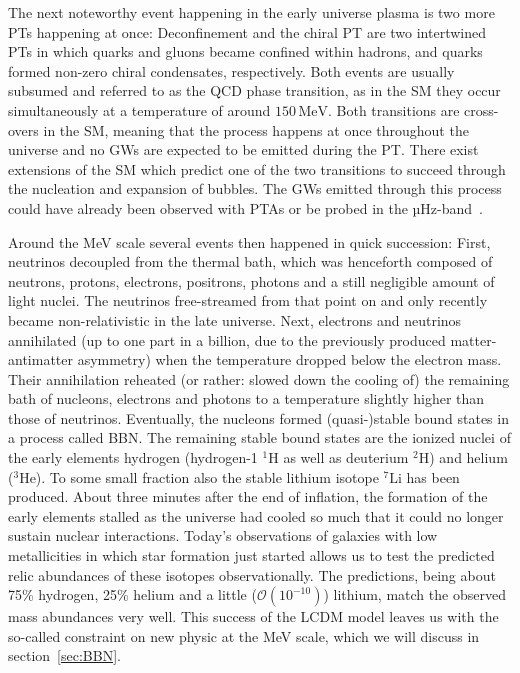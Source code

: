 The next noteworthy event happening in the early universe plasma is two more \acp{PT} happening at once: Deconfinement and the chiral \ac{PT} are two intertwined \acp{PT} in which quarks and gluons became confined within hadrons, and quarks formed non-zero chiral condensates, respectively. Both events are usually subsumed and referred to as the \ac{QCD} phase  transition, as in the \ac{SM} they occur simultaneously at a temperature of around $150 \, \text{MeV}$. Both transitions are cross-overs in the \ac{SM}, meaning that the process happens at once throughout the universe and no \acp{GW} are expected to be emitted during the \ac{PT}. There exist extensions of the \ac{SM} which predict one of the two transitions to succeed through the nucleation and expansion of bubbles. The \acp{GW} emitted through this process could have already been observed with \acp{PTA} or be probed in the µHz-band~\cite{Gao:2024pqm}.

Around the MeV scale several events then happened in quick succession: First, neutrinos decoupled from the thermal bath, which was henceforth composed of neutrons, protons, electrons, positrons, photons and a still negligible amount of light nuclei. The neutrinos free-streamed from that point on and only recently became non-relativistic in the late universe. Next, electrons and neutrinos annihilated (up to one part in a billion, due to the previously produced matter-antimatter asymmetry) when the temperature dropped below the electron mass. Their  annihilation reheated (or rather: slowed down the cooling of) the remaining bath of nucleons, electrons and photons to a temperature slightly higher than those of neutrinos. Eventually, the nucleons formed (quasi-)stable bound states in a process called \acf{BBN}. The remaining stable bound states are the ionized nuclei of the early elements hydrogen (hydrogen-1 ${}^1\text{H}$ as well as deuterium ${}^2\text{H}$) and helium (${}^3 \text{He}$). To some small fraction also the stable lithium isotope ${}^7 \text{Li}$ has been produced. About three minutes after the end of inflation, the formation of the early elements stalled as the universe had cooled so much that it could no longer sustain nuclear interactions. Today's observations of galaxies with low metallicities in which star formation just started allows us to test the predicted relic abundances of these isotopes observationally. The predictions, being about 75\% hydrogen, 25\% helium and a little ($\mathcal{O}(10^{-10})$) lithium, match the observed mass abundances very well. This success of the \ac{LCDM} model leaves us with the so-called \Neff constraint on new physic at the MeV scale, which we will discuss in section~\ref{sec:BBN}.

